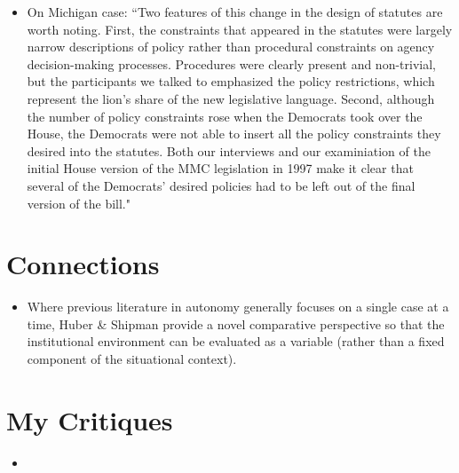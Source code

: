 \documentclass[12pt]{article}
\begin{document}
\begin{itemize}[leftmargin=*, itemsep=4pt]
    \item On Michigan case: ``Two features of this change in the design of statutes are worth noting. First, the constraints that appeared in the statutes were largely narrow descriptions of policy rather than procedural constraints on agency decision-making processes. Procedures were clearly present and non-trivial, but the participants we talked to emphasized the policy restrictions, which represent the lion's share of the new legislative language. Second, although the number of policy constraints rose when the Democrats took over the House, the Democrats were not able to insert all the policy constraints they desired into the statutes. Both our interviews and our examiniation of the initial House version of the MMC legislation in 1997 make it clear that several of the Democrats' desired policies had to be left out of the final version of the bill."
\end{itemize}


\section{Connections}

\begin{itemize}
    \item Where previous literature in autonomy generally focuses on a single case at a time, Huber \& Shipman provide a novel comparative perspective so that the institutional environment can be evaluated as a variable (rather than a fixed component of the situational context).
\end{itemize}


\section{My Critiques}

\begin{itemize}
    \item
\end{itemize}
\end{document}
